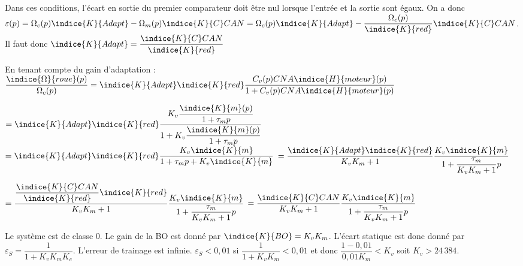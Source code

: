 \ifprof
\begin{corrige}
Dans ces conditions, l'écart en sortie du premier comparateur doit être nul lorsque l'entrée et la sortie sont égaux. 
On a donc $\varepsilon(p)=\Omega_c(p) \indice{K}{Adapt} -\Omega_m(p) \indice{K}{C} CAN 
=\Omega_c(p) \indice{K}{Adapt} -\dfrac{\Omega_c(p)}{\indice{K}{red}} \indice{K}{C} CAN $.
Il faut donc $\indice{K}{Adapt} = \dfrac{ \indice{K}{C} CAN}{\indice{K}{red}} $

\end{corrige}
\else
\fi

\ifprof
\begin{corrige}
En tenant compte du gain d'adaptation :
$\dfrac{\indice{\Omega}{roue}( p)}{\Omega_c(p)} =\indice{K}{Adapt} \indice{K}{red} \dfrac{C_v(p) CNA \indice{H}{moteur}(p)}{1+C_v(p) CNA \indice{H}{moteur}(p)}$

$=\indice{K}{Adapt} \indice{K}{red} \dfrac{K_v \dfrac{\indice{K}{m}(p)}{1+\tau_m p}}{1+K_v  \dfrac{\indice{K}{m}(p)}{1+\tau_m p}}$
$=\indice{K}{Adapt} \indice{K}{red} \dfrac{K_v \indice{K}{m}}{1+\tau_m p+K_v  \indice{K}{m}}$
$=\dfrac{\indice{K}{Adapt} \indice{K}{red}}{K_vK_m +1} \dfrac{K_v \indice{K}{m}}{1+\dfrac{\tau_m}{K_vK_m +1} p}$

$=\dfrac{\dfrac{ \indice{K}{C} CAN}{\indice{K}{red}} \indice{K}{red}}{K_vK_m +1} \dfrac{K_v \indice{K}{m}}{1+\dfrac{\tau_m}{K_vK_m +1} p}$
$=\dfrac{ \indice{K}{C} CAN }{K_vK_m +1} \dfrac{K_v \indice{K}{m}}{1+\dfrac{\tau_m}{K_vK_m +1} p}$
\end{corrige}
\else
\fi

\ifprof
\begin{corrige}
Le système est de classe 0. Le gain de la BO est donné par $\indice{K}{BO}  = K_v K_m $.
L'écart statique est donc donné par $\varepsilon_S = \dfrac{1}{1+K_v K_m K_c}$. L'erreur de trainage est infinie.
$\varepsilon_S  < 0,01$ si 
$\dfrac{1}{1+K_v K_m} < 0,01$ et donc 
$ \dfrac{1-0,01}{0,01 K_m}<K_v$ soit 
$K_v > 24\,384$.
\end{corrige}
\else
\fi





